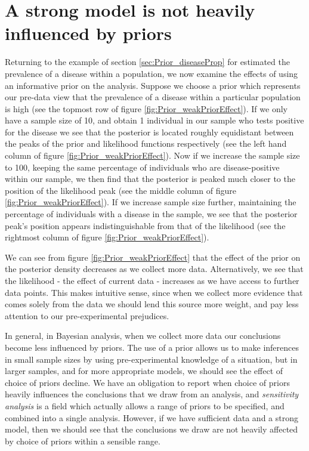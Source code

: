 \documentclass[11pt,fullpage]{book}
\begin{document}
\section{A strong model is not heavily influenced by priors}
Returning to the example of section \ref{sec:Prior_diseaseProp} for estimated the prevalence of a disease within a population, we now examine the effects of using an informative prior on the analysis. Suppose we choose a prior which represents our pre-data view that the prevalence of a disease within a particular population is high (see the topmost row of figure \ref{fig:Prior_weakPriorEffect}). If we only have a sample size of 10, and obtain 1 individual in our sample who tests positive for the disease we see that the posterior is located roughly equidistant between the peaks of the prior and likelihood functions respectively (see the left hand column of figure \ref{fig:Prior_weakPriorEffect}). Now if we increase the sample size to 100, keeping the same percentage of individuals who are disease-positive within our sample, we then find that the posterior is peaked much closer to the position of the likelihood peak (see the middle column of figure \ref{fig:Prior_weakPriorEffect}). If we increase sample size further, maintaining the percentage of individuals with a disease in the sample, we see that the posterior peak's position appears indistinguishable from that of the likelihood (see the rightmost column of figure \ref{fig:Prior_weakPriorEffect}). 

We can see from figure \ref{fig:Prior_weakPriorEffect} that the effect of the prior on the posterior density decreases as we collect more data. Alternatively, we see that the likelihood - the effect of current data  - increases as we have access to further data points. This makes intuitive sense, since when we collect more evidence that comes solely from the data we should lend this source more weight, and pay less attention to our pre-experimental prejudices.

In general, in Bayesian analysis, when we collect more data our conclusions become less influenced by priors. The use of a prior allows us to make inferences in small sample sizes by using pre-experimental knowledge of a situation, but in larger samples, and for more appropriate models, we should see the effect of choice of priors decline. We have an obligation to report when choice of priors heavily influences the conclusions that we draw from an analysis, and \textit{sensitivity analysis} is a field which actually allows a range of priors to be specified, and combined into a single analysis. However, if we have sufficient data and a strong model, then we should see that the conclusions we draw are not heavily affected by choice of priors within a sensible range.
\end{document}
